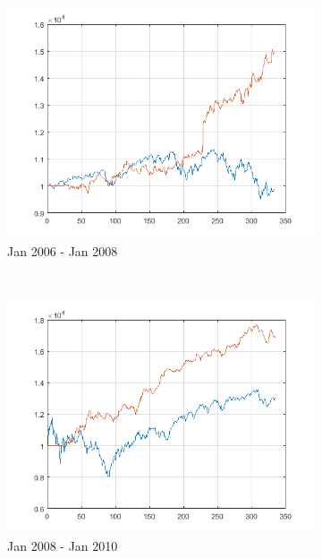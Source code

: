 \documentclass[11pt,a4,twosided,singlespacing,titlepagenumber=on]{scrreprt}
\numberwithin{equation}{chapter} %
\theoremstyle{remark}
\begin{document}
\begin{figure}[H]
\begin{subfigure}[t]{0.32\textwidth}
        \includegraphics[width=1\textwidth]{res/backtest/9}
        \caption{Jan 2006 - Jan 2008}
    \end{subfigure} \\
    \begin{subfigure}[t]{0.32\textwidth}
        \centering
        \includegraphics[width=1\textwidth]{res/backtest/10}
        \caption{Jan 2008 - Jan 2010}
    \end{subfigure}
    \begin{subfigure}[t]{0.32\textwidth}
        \centering

\end{subfigure}
\end{figure}
\end{document}
